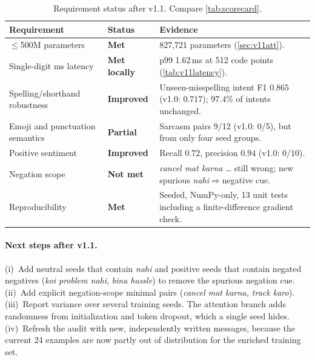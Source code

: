 \documentclass[11pt,a4paper]{article}
\theoremstyle{remark}
\newcommand{\hi}[1]{\textit{#1}}                       %
\begin{document}
\begin{table}[h]
\centering\small
\caption{Requirement status after v1.1. Compare \cref{tab:scorecard}.}
\label{tab:v11scorecard}
\begin{tabularx}{\linewidth}{@{}l l X@{}}
\toprule
Requirement & Status & Evidence \\
\midrule
$\le$500M parameters & \textcolor{okgreen}{\textbf{Met}} & 827{,}721 parameters (\cref{sec:v11att}). \\
Single-digit ms latency & \textcolor{okgreen}{\textbf{Met locally}} & p99 1.62\,ms at 512 code points (\cref{tab:v11latency}). \\
Spelling/shorthand robustness & \textcolor{okgreen}{\textbf{Improved}} & Unseen-misspelling intent F1 $0.865$ (v1.0: $0.717$); 97.4\% of intents unchanged. \\
Emoji and punctuation semantics & \textcolor{warn}{\textbf{Partial}} & Sarcasm pairs 9/12 (v1.0: 0/5), but from only four seed groups. \\
Positive sentiment & \textcolor{okgreen}{\textbf{Improved}} & Recall $0.72$, precision $0.94$ (v1.0: 0/10). \\
Negation scope & \textcolor{warn}{\textbf{Not met}} & \hi{cancel mat karna \dots} still wrong; new spurious \hi{nahi}$\Rightarrow$negative cue. \\
Reproducibility & \textcolor{okgreen}{\textbf{Met}} & Seeded, NumPy-only, 13 unit tests including a finite-difference gradient check. \\
\bottomrule
\end{tabularx}
\end{table}

\paragraph{Next steps after v1.1.} (i)~Add neutral seeds that contain
\hi{nahi} and positive seeds that contain negated negatives (\hi{koi problem
nahi}, \hi{bina hassle}) to remove the spurious negation cue.
(ii)~Add explicit negation-scope minimal pairs (\hi{cancel mat karna, track
karo}). (iii)~Report variance over several training seeds. The attention
branch adds randomness from initialization and token dropout, which a single
seed hides. (iv)~Refresh the audit with new, independently written messages,
because the current 24 examples are now partly out of distribution for the
enriched training set.

\end{document}
